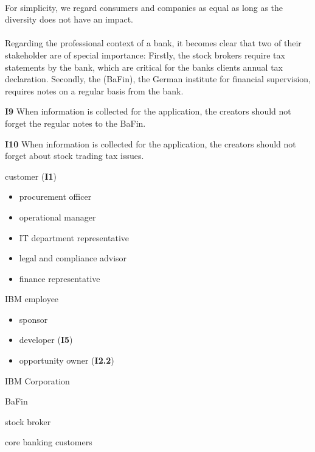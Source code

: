 \paragraph{} For simplicity, we regard consumers and companies as equal as long as the diversity does not have an impact.

\paragraph{}
Regarding the professional context of a bank, it becomes clear that two of their stakeholder are of special importance: Firstly, the stock brokers require tax statements by the bank, which are critical for the banks clients annual tax declaration. Secondly, the  (BaFin), the German institute for financial supervision, requires notes on a regular basis from the bank.

\begin{closeItem}
    \item [\textbf{I9}] When information is collected for the application, the creators should not forget the regular notes to the BaFin.
    \item [\textbf{I10}] When information is collected for the application, the creators should not forget about stock trading tax issues.
\end{closeItem}

\vspace{2em}


\begin{closeItemCol}
    \item customer (\textbf{I1})
    \begin{itemize}
        \item procurement officer
        \item operational manager
        \item IT department representative
        \item legal and compliance advisor
        \item finance representative
    \end{itemize}
    \item IBM employee 
    \begin{itemize}
        \item sponsor
        \item developer (\textbf{I5})
        \item opportunity owner (\textbf{I2.2})
    \end{itemize}
    \item IBM Corporation
    \columnbreak
    \item BaFin
    \item stock broker
    \item core banking customers
\end{closeItemCol}

